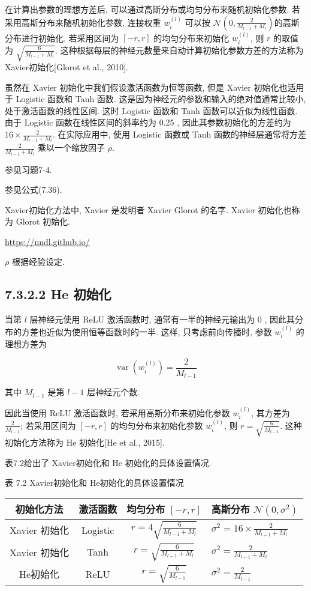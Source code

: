 \documentclass[10pt]{article}
\begin{document}
在计算出参数的理想方差后, 可以通过高斯分布或均匀分布来随机初始化参数. 若采用高斯分布来随机初始化参数, 连接权重 $w_{i}^{(l)}$ 可以按 $\mathcal{N}\left(0, \frac{2}{M_{l-1}+M_{l}}\right)$的高斯分布进行初始化. 若采用区间为 $[-r, r]$ 的均匀分布来初始化 $w_{i}^{(l)}$, 则 $r$ 的取值为 $\sqrt{\frac{6}{M_{l-1}+M_{l}}}$. 这种根据每层的神经元数量来自动计算初始化参数方差的方法称为Xavier初始化[Glorot et al., 2010].

虽然在 Xavier 初始化中我们假设激活函数为恒等函数, 但是 Xavier 初始化也适用于 Logistic 函数和 Tanh 函数. 这是因为神经元的参数和输入的绝对值通常比较小, 处于激活函数的线性区间. 这时 Logistic 函数和 Tanh 函数可以近似为线性函数. 由于 Logistic 函数在线性区间的斜率约为 0.25 , 因此其参数初始化的方差约为 $16 \times \frac{2}{M_{l-1}+M_{l}}$. 在实际应用中, 使用 Logistic 函数或 Tanh 函数的神经层通常将方差 $\frac{2}{M_{l-1}+M_{l}}$ 乘以一个缩放因子 $\rho$.

参见习题7-4.

参见公式(7.36).

Xavier初始化方法中, Xavier 是发明者 Xavier Glorot 的名字. Xavier 初始化也称为 Glorot 初始化.

\href{https://nndl.github.io/}{https://nndl.github.io/}

$\rho$ 根据经验设定.

\subsection*{7.3.2.2 He 初始化}
当第 $l$ 层神经元使用 ReLU 激活函数时, 通常有一半的神经元输出为 0 , 因此其分布的方差也近似为使用恒等函数时的一半. 这样, 只考虑前向传播时, 参数 $w_{i}^{(l)}$ 的理想方差为


\begin{equation*}
\operatorname{var}\left(w_{i}^{(l)}\right)=\frac{2}{M_{l-1}} \tag{7.45}
\end{equation*}


其中 $M_{l-1}$ 是第 $l-1$ 层神经元个数.

因此当使用 ReLU 激活函数时, 若采用高斯分布来初始化参数 $w_{i}^{(l)}$, 其方差为 $\frac{2}{M_{l-1}}$; 若采用区间为 $[-r, r]$ 的均匀分布来初始化参数 $w_{i}^{(l)}$, 则 $r=\sqrt{\frac{6}{M_{l-1}}}$. 这种初始化方法称为 He 初始化[He et al., 2015].

表7.2给出了 Xavier初始化和 He 初始化的具体设置情况.

表 7.2 Xavier初始化和 He初始化的具体设置情况

\begin{center}
\begin{tabular}{c|c|c|l}
\hline
初始化方法 & 激活函数 & 均匀分布 $[-r, r]$ & 高斯分布 $\mathcal{N}\left(0, \sigma^{2}\right)$ \\
\hline
Xavier 初始化 & Logistic & $r=4 \sqrt{\frac{6}{M_{l-1}+M_{l}}}$ & $\sigma^{2}=16 \times \frac{2}{M_{l-1}+M_{l}}$ \\
\hline
Xavier 初始化 & Tanh & $r=\sqrt{\frac{6}{M_{l-1}+M_{l}}}$ & $\sigma^{2}=\frac{2}{M_{l-1}+M_{l}}$ \\
\hline
He初始化 & ReLU & $r=\sqrt{\frac{6}{M_{l-1}}}$ & $\sigma^{2}=\frac{2}{M_{l-1}}$ \\
\hline
\end{tabular}
\end{center}
\end{document}
